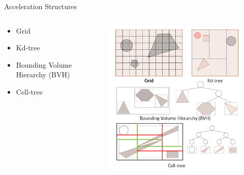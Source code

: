 \documentclass{beamer}
\begin{document}
\begin{frame}{Acceleration Structures}
	
	\begin{columns}
		\begin{column}{.49\textwidth}
			\begin{itemize}
				\item Grid
				\item Kd-tree
				\item Bounding Volume Hierarchy (BVH)
				\item Cell-tree \cite{GarthPaper}
			\end{itemize}
		\end{column}
		
		\begin{column}{.49\textwidth}
			\begin{figure}[!ht]
				\centering
				\includegraphics[width=1.0\linewidth]{figures/accelstructs}
			\end{figure}
		\end{column}
	\end{columns}
\end{frame}
\end{document}
